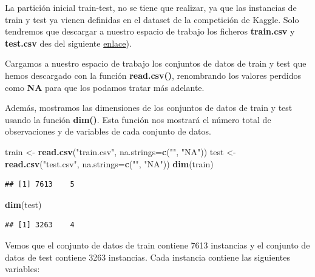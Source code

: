 \documentclass[]{article}
\newenvironment{Shaded}{\begin{snugshade}}{\end{snugshade}}
\newcommand{\DataTypeTok}[1]{\textcolor[rgb]{0.13,0.29,0.53}{#1}}
\newcommand{\KeywordTok}[1]{\textcolor[rgb]{0.13,0.29,0.53}{\textbf{#1}}}
\newcommand{\NormalTok}[1]{#1}
\newcommand{\StringTok}[1]{\textcolor[rgb]{0.31,0.60,0.02}{#1}}
\begin{document}
La partición inicial train-test, no se tiene que realizar, ya que las
instancias de train y test ya vienen definidas en el dataset de la
competición de Kaggle. Solo tendremos que descargar a nuestro espacio de trabajo los ficheros
\textbf{train.csv} y \textbf{test.csv} des del siguiente 
\href{https://www.kaggle.com/c/nlp-getting-started/data}{\color{blue}enlace}).

Cargamos a nuestro espacio de trabajo los conjuntos de datos de train y test que hemos descargado con la función \textbf{read.csv()}, renombrando los valores perdidos como \textbf{NA} para que los podamos tratar más adelante. 

Además, mostramos las dimensiones de los conjuntos de datos de train y test usando la función \textbf{dim()}. Esta función nos mostrará el número total de observaciones y de variables de cada conjunto de datos.

\vspace{3mm}

\begin{Shaded}
\begin{Highlighting}[]
\NormalTok{train <-}\StringTok{ }\KeywordTok{read.csv}\NormalTok{(}\StringTok{"train.csv"}\NormalTok{, }\DataTypeTok{na.strings=}\KeywordTok{c}\NormalTok{(}\StringTok{""}\NormalTok{, }\StringTok{"NA"}\NormalTok{))}
\NormalTok{test <-}\StringTok{ }\KeywordTok{read.csv}\NormalTok{(}\StringTok{"test.csv"}\NormalTok{, }\DataTypeTok{na.strings=}\KeywordTok{c}\NormalTok{(}\StringTok{""}\NormalTok{, }\StringTok{"NA"}\NormalTok{))}
\KeywordTok{dim}\NormalTok{(train)}
\end{Highlighting}
\end{Shaded}

\begin{verbatim}
## [1] 7613    5
\end{verbatim}

\begin{Shaded}
\begin{Highlighting}[]
\KeywordTok{dim}\NormalTok{(test)}
\end{Highlighting}
\end{Shaded}

\begin{verbatim}
## [1] 3263    4
\end{verbatim}

Vemos que el conjunto de datos de train contiene 7613 instancias y el
conjunto de datos de test contiene 3263 instancias. Cada instancia
contiene las siguientes variables:
\end{document}

